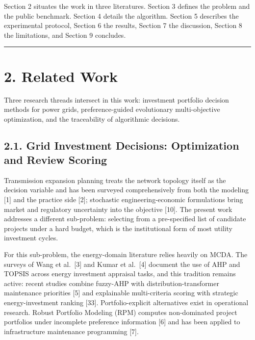 \documentclass[
  10pt,
  a4paper,
]{article}
\begin{document}
Section 2 situates the work in three literatures. Section 3 defines the
problem and the public benchmark. Section 4 details the algorithm.
Section 5 describes the experimental protocol, Section 6 the results,
Section 7 the discussion, Section 8 the limitations, and Section 9
concludes.

\begin{center}\rule{0.5\linewidth}{0.5pt}\end{center}

\section{2. Related Work}\label{related-work}

Three research threads intersect in this work: investment portfolio
decision methods for power grids, preference-guided evolutionary
multi-objective optimization, and the traceability of algorithmic
decisions.

\subsection{2.1. Grid Investment Decisions: Optimization and Review
Scoring}\label{grid-investment-decisions-optimization-and-review-scoring}

Transmission expansion planning treats the network topology itself as
the decision variable and has been surveyed comprehensively from both
the modeling {[}1{]} and the practice side {[}2{]}; stochastic
engineering-economic formulations bring market and regulatory
uncertainty into the objective {[}10{]}. The present work addresses a
different sub-problem: selecting from a pre-specified list of candidate
projects under a hard budget, which is the institutional form of most
utility investment cycles.

For this sub-problem, the energy-domain literature relies heavily on
MCDA. The surveys of Wang et al.~{[}3{]} and Kumar et al.~{[}4{]}
document the use of AHP and TOPSIS across energy investment appraisal
tasks, and this tradition remains active: recent studies combine
fuzzy-AHP with distribution-transformer maintenance priorities {[}5{]}
and explainable multi-criteria scoring with strategic energy-investment
ranking {[}33{]}. Portfolio-explicit alternatives exist in operational
research. Robust Portfolio Modeling (RPM) computes non-dominated project
portfolios under incomplete preference information {[}6{]} and has been
applied to infrastructure maintenance programming {[}7{]}.
\end{document}
